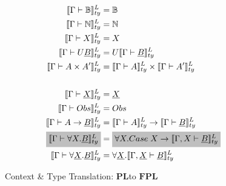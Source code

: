 \documentclass[acmsmall]{acmart}
\newcommand{\den}[1]{\llbracket #1\rrbracket}
\newcommand{\denLty}[1]{\den{#1}^L_{ty}}
\newcommand{\pl}{$\mathbf{PL}$}
\newcommand{\fpl}{$\mathbf{FPL}$}
\begin{document}
\begin{figure}[H]
  \begin{align*}
  \denLty{\Gamma \vdash \mathbb{B}} &= \mathbb{B} \\
  \denLty{\Gamma \vdash \mathbb{N}} &= \mathbb{N} \\
  \denLty{\Gamma \vdash X} &= X \\%
  \denLty{\Gamma \vdash U\underline{B}} &= U \denLty{\Gamma \vdash \underline{B}} \\
  \denLty{\Gamma \vdash A \times A'} &= \denLty{\Gamma \vdash A} \times \denLty{\Gamma \vdash A'} \\
  \\
  \denLty{\Gamma \vdash \underline{X}} &= \underline{X} \\%
  \denLty{\Gamma \vdash Obs} &= Obs \\
  \denLty{\Gamma \vdash A \rightarrow \underline{B}} &= \denLty{\Gamma \vdash A} \rightarrow \denLty{\Gamma \vdash \underline{B}} \\
  \colorbox{lightgray}{$\denLty{\Gamma \vdash \forall X . \underline{B}}$} &= \colorbox{lightgray}{$\forall X. Case \;X \rightarrow \denLty{\Gamma,X \vdash \underline{B}}$} \\
  \denLty{\Gamma \vdash \forall \underline{X}. \underline{B}} &= \forall \underline{X}. \denLty{\Gamma,\underline{X} \vdash \underline{B}} \\
  \end{align*}
  \caption{Context \& Type Translation: \pl to \fpl}
  \label{fig:TypeTranslationPLFPL}
  \end{figure}
\end{document}
